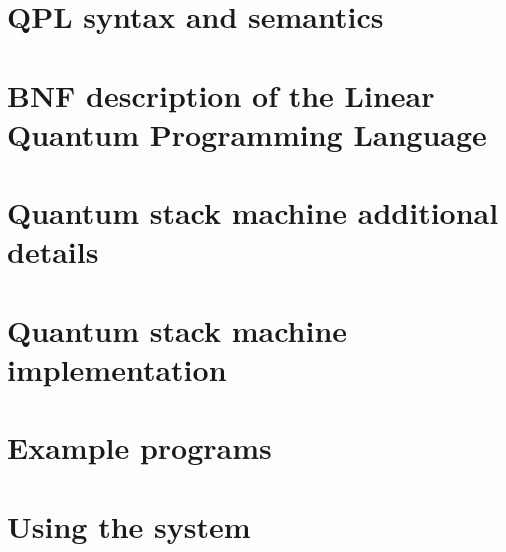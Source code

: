 \chapter{QPL syntax and semantics}\label{appchap:qplsyntaxandsemantics}


\chapter{BNF description of  the Linear Quantum Programming Language}\label{chap:formalSpecificationLinearQuantumProgrammingLanguage}

\chapter{Quantum stack machine additional details}\label{chap:qsmadditional}


\chapter{Quantum stack machine implementation}\label{chap:qsmimplementation}


\chapter{Example \protect{\lqpl{}} programs}\label{app:exampleprograms}


\chapter{Using the system}\label{app:usethesystem}

